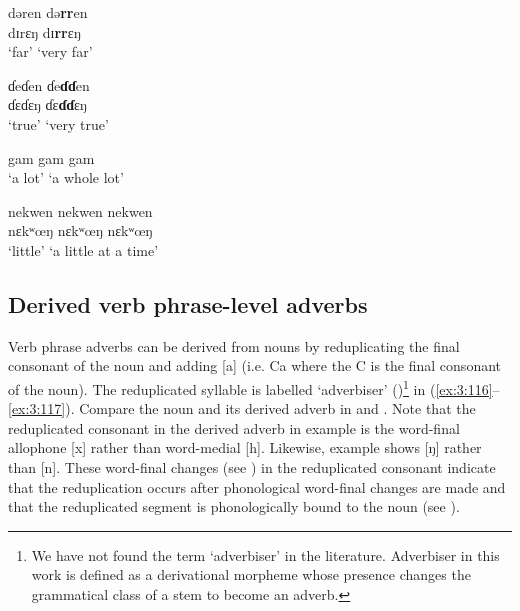 \ea \label{ex:3:112}
\gll dəren \hspace{20pt}  də\textbf{rr}en\\
      dɪrɛŋ  \hspace{20pt}   dɪ\textbf{rr}ɛŋ\\
\glt  ‘far’  \hspace{27pt}  ‘very far’
\z

\ea \label{ex:3:113}
\gll ɗeɗen   \hspace{20pt}   ɗe\textbf{ɗɗ}en\\
      ɗɛɗɛŋ  \hspace{20pt}    ɗɛ\textbf{ɗɗ}ɛŋ\\
\glt  ‘true’  \hspace{25pt}   ‘very true’
\z

\ea \label{ex:3:114}
gam  \hspace{30pt}    gam gam\\
\glt  ‘a lot’ \hspace{25pt}     ‘a whole lot’
\z

\ea \label{ex:3:115}
nekwen   \hspace{15pt}   nekwen nekwen\\
  nɛkʷœŋ   \hspace{15pt}   nɛkʷœŋ nɛkʷœŋ\\
\glt  ‘little’  \hspace{25pt}   ‘a little at a time’
\z

\subsection{  Derived verb phrase-level adverbs}\label{sec:3.5.2}
\hypertarget{RefHeading1211181525720847}{}
Verb phrase adverbs can be derived from nouns by reduplicating the final consonant of the noun and adding [a] (i.e. Ca where the C is the final consonant of the noun). The reduplicated syllable is labelled ‘adverbiser’ ({\ADV})\footnote{We have not found the term ‘adverbiser’ in the literature. Adverbiser in this work is defined as a derivational morpheme whose presence changes the grammatical class of a stem to become an adverb.} in (\ref{ex:3:116}--\ref{ex:3:117}). Compare the noun and its derived adverb in  and . Note that the reduplicated consonant in the derived adverb in example  is the word-final allophone [x] rather than word-medial [h]. Likewise, example  shows [ŋ] rather than [n]. These word-final changes (see ) in the reduplicated consonant indicate that the reduplication occurs after phonological word-final changes are made and that the reduplicated segment is phonologically bound to the noun (see ). 

